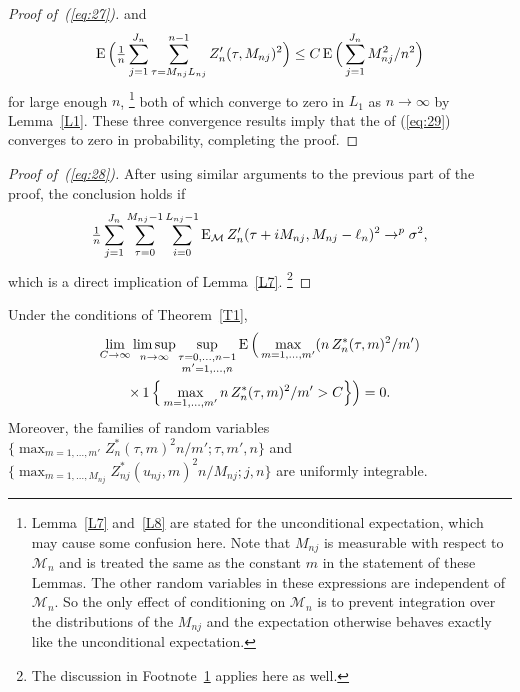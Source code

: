 \documentclass[11pt]{article}
\begin{document}
\begin{proof}[Proof of~(\ref{eq:27})]
  and
  \begin{equation*}
    \operatorname{E} \Big(\tfrac{1}{n} \sum_{j=1}^{J_n} \sum_{\tau= M_{nj}L_{nj}}^{n-1} Z_{n}'(\tau, M_{nj})^2\Big)
    \leq
    C \operatorname{E} \Big(\sum_{j=1}^{J_n} M_{nj}^2 / n^2 \Big)
  \end{equation*}
  for large enough $n$,%
\footnote{Lemma~\ref{L7}
  and~\ref{L8} are stated for the
  unconditional expectation, which may cause some confusion here. Note
  that $M_{nj}$ is measurable with respect to $\mathcal{M}_n$ and
  is treated the same as the constant $m$ in the statement of
  these Lemmas.  The other random variables in
  these expressions are independent of $\mathcal{M}_n$. So the only
  effect of conditioning on $\mathcal{M}_n$ is to prevent integration
  over the distributions of the $M_{nj}$ and the expectation otherwise
  behaves exactly like the unconditional expectation.\label{f:1}} %
  both of which converge to zero in $L_1$ as $n \to \infty$ by
  Lemma~\ref{L1}.  These three convergence
  results imply that the  of (\ref{eq:29}) converges to
  zero in probability, completing the proof.
\end{proof}

\begin{proof}[Proof of~(\ref{eq:28})]
  After using similar arguments to the previous part of the proof,
  the conclusion holds if
  \begin{equation*}
    \tfrac{1}{n} \sum_{j=1}^{J_n} \sum_{\tau=0}^{M_{nj}-1} \sum_{i=0}^{L_{nj} - 1}
    \operatorname{E}_{\mathcal{M}} Z_n'(\tau + i M_{nj}, M_{nj} - \ell_n)^2 \to^p \sigma^2,
  \end{equation*}
  which is a direct implication of
  Lemma~\ref{L7}.%
  \footnote{The discussion in Footnote~\ref{f:1} applies here as well.}
\end{proof}

\begin{lem}\label{L6}
  Under the conditions of Theorem~\ref{T1},
  \begin{multline}\label{eq:30}
    \lim_{C \to \infty} \limsup_{n \to \infty} \sup_{\substack{\tau = 0,\dots,n-1 \\ m'=1,\dots,n}}
    \operatorname{E}\Big(\max_{m = 1,\dots,m'} (n \, Z^*_n(\tau, m)^2 / m') \\
    \times \operatorname{1}\Big\{\max_{m = 1,\dots,m'} n \, Z^*_n(\tau, m)^2 / m' > C\Big\}\Big)
    = 0.
  \end{multline}
  Moreover, the families of random variables
  $\{\max_{m=1,\dots,m'} Z^{*}_n(\tau, m)^2 n / m'; \tau, m', n\}$ and
  $\{\max_{m=1,\dots,M_{nj}} Z^{*}_{nj}(u_{nj}, m)^2 n / M_{nj}; j, n\}$ are uniformly integrable.
\end{lem}
\end{document}

